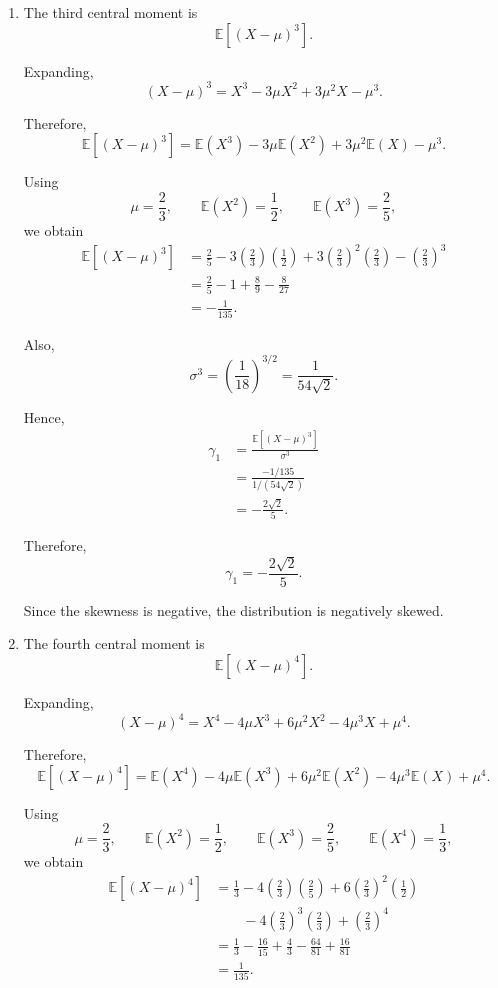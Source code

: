 \documentclass[11pt]{article}
\newenvironment{solution}{
    \par
    \begin{tcolorbox}[
        colback=white,
        colframe=uwgold,
        boxrule=0.7pt,
        arc=2mm,
        left=3mm,
        right=3mm,
        top=2mm,
        bottom=2mm,
        breakable,
        before skip=0.5em,
        after skip=1em,
        title=\textbf{Solution},
        coltitle=uwpurple,
        fonttitle=\bfseries
    ]
}{
    \end{tcolorbox}
}
\newcommand{\E}{\mathbb{E}}
\begin{document}
\begin{solution}
\begin{enumerate}[label=(\alph*)]
Since \(m\in(0,1)\),
\[
m=\frac1{\sqrt2}.
\]


\item The third central moment is
\[
\mathbb{E}[(X-\mu)^3].
\]

Expanding,
\[
(X-\mu)^3
=
X^3-3\mu X^2+3\mu^2X-\mu^3.
\]

Therefore,
\[
\mathbb{E}[(X-\mu)^3]
=
\E(X^3)
-3\mu\E(X^2)
+3\mu^2\E(X)
-\mu^3.
\]

Using
\[
\mu=\frac23,
\qquad
\E(X^2)=\frac12,
\qquad
\E(X^3)=\frac25,
\]
we obtain
\[
\begin{aligned}
\mathbb{E}[(X-\mu)^3]
&=
\frac25
-
3\left(\frac23\right)\left(\frac12\right)
+
3\left(\frac23\right)^2\left(\frac23\right)
-
\left(\frac23\right)^3\\
&=
\frac25-1+\frac89-\frac8{27}\\
&=
-\frac1{135}.
\end{aligned}
\]

Also,
\[
\sigma^3
=
\left(\frac1{18}\right)^{3/2}
=
\frac{1}{54\sqrt2}.
\]

Hence,
\[
\begin{aligned}
\gamma_1
&=
\frac{\mathbb{E}[(X-\mu)^3]}{\sigma^3}\\
&=
\frac{-1/135}{1/(54\sqrt2)}\\
&=
-\frac{2\sqrt2}{5}.
\end{aligned}
\]

Therefore,
\[
\gamma_1=-\frac{2\sqrt2}{5}.
\]

Since the skewness is negative, the distribution is negatively skewed.


\item The fourth central moment is
\[
\mathbb{E}[(X-\mu)^4].
\]

Expanding,
\[
(X-\mu)^4
=
X^4
-4\mu X^3
+6\mu^2X^2
-4\mu^3X
+\mu^4.
\]

Therefore,
\[
\mathbb{E}[(X-\mu)^4]
=
\E(X^4)
-4\mu\E(X^3)
+6\mu^2\E(X^2)
-4\mu^3\E(X)
+\mu^4.
\]

Using
\[
\mu=\frac23,
\qquad
\E(X^2)=\frac12,
\qquad
\E(X^3)=\frac25,
\qquad
\E(X^4)=\frac13,
\]
we obtain
\[
\begin{aligned}
\mathbb{E}[(X-\mu)^4]
&=
\frac13
-
4\left(\frac23\right)\left(\frac25\right)
+
6\left(\frac23\right)^2\left(\frac12\right)\\
&\qquad
-
4\left(\frac23\right)^3\left(\frac23\right)
+
\left(\frac23\right)^4\\
&=
\frac13
-\frac{16}{15}
+\frac43
-\frac{64}{81}
+\frac{16}{81}\\
&=
\frac1{135}.
\end{aligned}
\]


\end{enumerate}
\end{solution}
\end{document}
